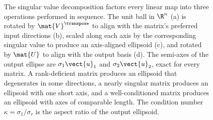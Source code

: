 \begin{figure}[htbp]
\caption[The SVD as rotation-scaling-rotation]{The singular value
decomposition factors every linear map into three operations performed
in sequence. The unit ball in $\R^{n}$ (a) is rotated by
$\mat{V}^{\transpose}$ to align with the matrix's preferred input
directions (b), scaled along each axis by the corresponding singular
value to produce an axis-aligned ellipsoid (c), and rotated by
$\mat{U}$ to align with the output basis (d). The semi-axes of the
output ellipse are $\sigma_{1}\vect{u}_{1}$ and
$\sigma_{2}\vect{u}_{2}$, exact for every matrix. A rank-deficient
matrix produces an ellipsoid that degenerates in some directions, a
nearly singular matrix produces an ellipsoid with one short axis, and
a well-conditioned matrix produces an ellipsoid with axes of
comparable length. The condition number $\kappa = \sigma_{1}/\sigma_{r}$
is the aspect ratio of the output ellipsoid.}
\label{fig:vol02:ch10:svd-geometry}
\end{figure}

